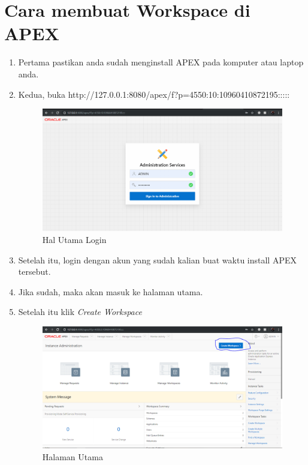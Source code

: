 \documentclass{article}
\begin{document}
\section{Cara membuat Workspace di APEX} 
\begin{enumerate}
    \item Pertama pastikan anda sudah menginstall APEX pada komputer atau laptop anda.
    \item Kedua, buka http://127.0.0.1:8080/apex/f?p=4550:10:10960410872195:::::
    \begin{figure}[!htbp]
        \centering
        \includegraphics[scale=0.3]{LangkahPertama.PNG}
        \caption{Hal Utama Login}
    \end{figure}
    \item Setelah itu, login dengan akun yang sudah kalian buat waktu install APEX tersebut.
    \item Jika sudah, maka akan masuk ke halaman utama.
    \item Setelah itu klik \textit{Create Workspace}
    \begin{figure}[!htbp]
        \centering
        \includegraphics[scale=0.3]{LangkahKedua.PNG}
        \caption{Halaman Utama}
    \end{figure}

\end{enumerate}
\end{document}
